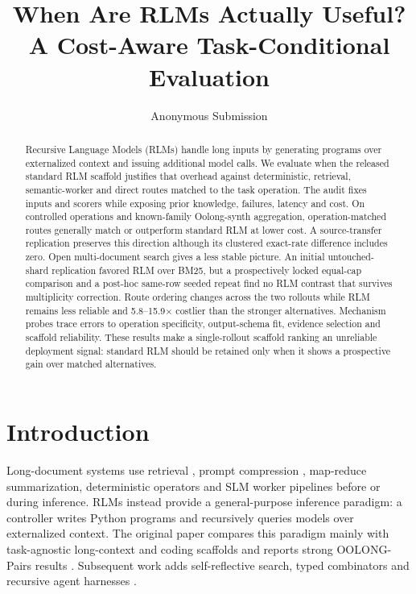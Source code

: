 \documentclass[letterpaper]{article}
\title{When Are RLMs Actually Useful?\\
A Cost-Aware Task-Conditional Evaluation}
\author{Anonymous Submission}
\begin{document}
\maketitle

\begin{abstract}
		Recursive Language Models (RLMs) handle long inputs by generating programs over externalized context and issuing additional model calls. We evaluate when the released standard RLM scaffold justifies that overhead against deterministic, retrieval, semantic-worker and direct routes matched to the task operation. The audit fixes inputs and scorers while exposing prior knowledge, failures, latency and cost. On controlled operations and known-family Oolong-synth aggregation, operation-matched routes generally match or outperform standard RLM at lower cost. A source-transfer replication preserves this direction although its clustered exact-rate difference includes zero. Open multi-document search gives a less stable picture. An initial untouched-shard replication favored RLM over BM25, but a prospectively locked equal-cap comparison and a post-hoc same-row seeded repeat find no RLM contrast that survives multiplicity correction. Route ordering changes across the two rollouts while RLM remains less reliable and 5.8--15.9$\times$ costlier than the stronger alternatives. Mechanism probes trace errors to operation specificity, output-schema fit, evidence selection and scaffold reliability. These results make a single-rollout scaffold ranking an unreliable deployment signal: standard RLM should be retained only when it shows a prospective gain over matched alternatives.
\end{abstract}

\section{Introduction}

Long-document systems use retrieval \citep{lewis2020rag}, prompt compression \citep{jiang2023llmlingua}, map-reduce summarization, deterministic operators and SLM worker pipelines \citep{khot2023decomposed} before or during inference. RLMs \citep{zhang2025rlm} instead provide a general-purpose inference paradigm: a controller writes Python programs and recursively queries models over externalized context. The original paper compares this paradigm mainly with task-agnostic long-context and coding scaffolds and reports strong OOLONG-Pairs results \citep{zhang2025rlm,bertsch2025oolong}. Subsequent work adds self-reflective search, typed combinators and recursive agent harnesses \citep{srlm2026,lambdarlm2026,lumer2026rah}.
\end{document}
